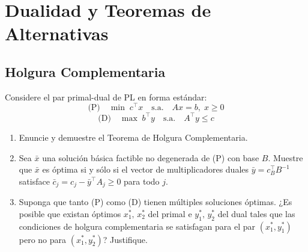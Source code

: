 \documentclass[12pt]{article}
\theoremstyle{plain}
\begin{document}
\section{Dualidad y Teoremas de Alternativas}

\subsection{Holgura Complementaria}

Considere el par primal-dual de PL en forma estándar:
\[
      \text{(P)} \quad \min\; c^\top x \quad \text{s.a.} \quad Ax = b,\; x \geq 0
\]
\[
      \text{(D)} \quad \max\; b^\top y \quad \text{s.a.} \quad A^\top y \leq c
\]

\begin{enumerate}[label=\alph*)]
      \item Enuncie y demuestre el Teorema de Holgura Complementaria.

      \item Sea $\bar{x}$ una solución básica factible no degenerada de (P) con base $B$.
            Muestre que $\bar{x}$ es óptima si y sólo si el vector de multiplicadores duales
            $\bar{y} = c_B^\top B^{-1}$ satisface $\bar{c}_j = c_j - \bar{y}^\top A_j \geq 0$
            para todo $j$.

      \item Suponga que tanto (P) como (D) tienen múltiples soluciones óptimas. ¿Es posible
            que existan óptimos $x^*_1,\, x^*_2$ del primal e $y^*_1,\, y^*_2$ del dual tales
            que las condiciones de holgura complementaria se satisfagan para el par
            $(x^*_1, y^*_1)$ pero no para $(x^*_1, y^*_2)$? Justifique.
\end{enumerate}
\end{document}
